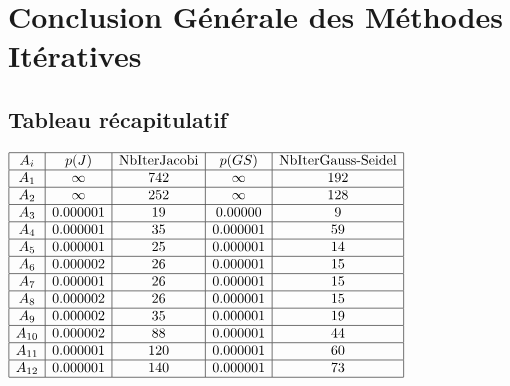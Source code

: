 



% 
\section{Conclusion Générale des Méthodes Itératives}
\subsection{Tableau récapitulatif}
$
\begin{array}{|c|c|c|c|c|}
\hline
A_i & p(J) & \text{NbIterJacobi} & p(GS) & \text{NbIterGauss-Seidel} \\
\hline
A_1 & \infty & 742 & \infty & 192\\
\hline
A_2 & \infty & 252 & \infty & 128 \\
\hline
A_3 & 0.000001& 19 & 0.00000 & 9 \\
\hline
A_4 & 0.000001 & 35 & 0.000001& 59 \\
\hline
A_5 & 0.000001 & 25 & 0.000001& 14 \\
\hline
A_6 & 0.000002 & 26 & 0.000001 & 15 \\
\hline
A_7 & 0.000001 & 26 & 0.000001 & 15 \\
\hline
A_8 & 0.000002 & 26 & 0.000001 & 15 \\
\hline
A_9 & 0.000002 & 35 & 0.000001 & 19 \\ 
\hline
A_{10} & 0.000002 & 88 & 0.000001 & 44 \\
\hline
A_{11} & 0.000001 & 120 & 0.000001& 60 \\
\hline
A_{12} & 0.000001 & 140 & 0.000001 & 73 \\
\hline
\end{array}
$

